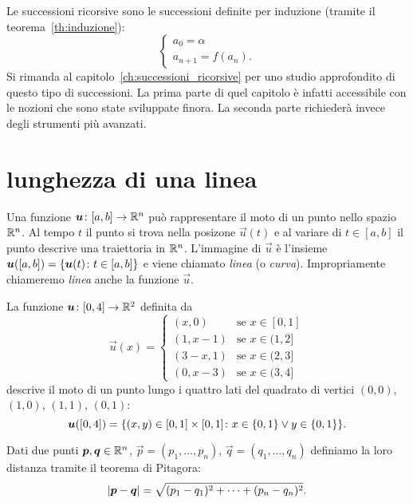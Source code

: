 Le successioni ricorsive sono le successioni
definite per induzione (tramite il teorema~\ref{th:induzione}):
\[
 \begin{cases}
   a_0 = \alpha \\
   a_{n+1} = f(a_n).
 \end{cases}
\]
Si rimanda al capitolo~\ref{ch:successioni_ricorsive}
per uno studio approfondito di questo tipo di successioni.
La prima parte di quel capitolo è infatti accessibile con le nozioni
che sono state sviluppate finora.
La seconda parte richiederà invece degli strumenti più avanzati.
    
\section{lunghezza di una linea}

Una funzione $\boldsymbol u\colon [a,b]\to {\mathbb R}^n$ può rappresentare 
il moto di un punto nello spazio ${\mathbb R}^n$. 
Al tempo $t$ il punto si trova nella posizone $\vec u(t)$
e al variare di $t\in [a,b]$ il punto descrive una traiettoria in ${\mathbb R}^n$.
L'immagine di $\vec u$ è l'insieme $\boldsymbol u([a,b]) ={\left\{ \boldsymbol u(t)\colon t\in[a,b] \right\}}$
e viene chiamato \emph{linea} (o \emph{curva}).
Impropriamente chiameremo \emph{linea} anche la funzione $\vec u$.
 
\begin{example}[quadrato]
La funzione $\boldsymbol u \colon [0,4]\to {\mathbb R}^2$ definita da 
\[
\vec u(x) = \begin{cases} 
     (x,0) & \text{se $x\in [0,1]$} \\
     (1,x-1) & \text{se $x\in (1,2]$} \\
     (3-x,1) & \text{se $x\in (2,3]$} \\
     (0,x-3) & \text{se $x\in (3,4]$}
\end{cases}
\]
descrive il moto di un punto lungo i quattro lati 
del quadrato di vertici $(0,0)$, $(1,0)$, $(1,1)$, $(0,1)$:
\[
 \boldsymbol u([0,4]) = {\left\{ (x,y)\in[0,1]\times[0,1]\colon 
 x\in{\left\{ 0,1 \right\}} \lor y \in {\left\{ 0,1 \right\}} \right\}}.  
\]
\end{example}

Dati due punti $\boldsymbol p, \boldsymbol q \in {\mathbb R}^n$,
$\vec p = (p_1,\dots, p_n)$, $\vec q=(q_1,\dots,q_n)$  
definiamo la loro distanza tramite il teorema di Pitagora:
\[
 {\left|\boldsymbol p - \boldsymbol q\right|} = \sqrt{(p_1-q_1)^2 + \dots + (p_n-q_n)^2}.  
\]

